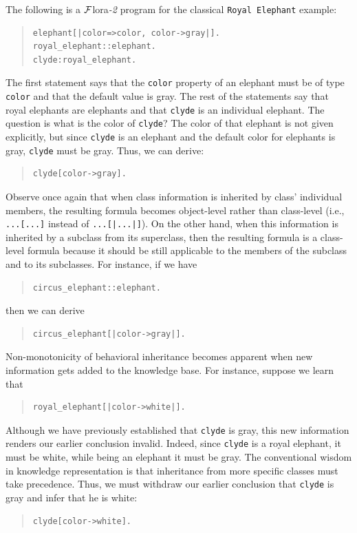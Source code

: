 \documentclass[11pt]{article}
\newcommand{\FLSYSTEM}{{\mbox{\sc ${\cal F}${lora}\rm\emph{-2}}}\xspace}
\begin{document}
The following is a \FLSYSTEM program for the classical {\tt Royal Elephant}
example:
\begin{quote}
\begin{verbatim}
elephant[|color=>color, color->gray|].
royal_elephant::elephant.
clyde:royal_elephant.
\end{verbatim}
\end{quote}
The first statement says that the \texttt{color} property of an elephant
must be of type \texttt{color} and that the default value is gray.  
The rest of the statements say that royal elephants are elephants and that
\texttt{clyde} is an individual elephant. 
The question is what is the color of {\tt clyde}? The color of that
elephant is not given explicitly, but since
{\tt clyde} is an elephant and the default color for elephants is gray,
{\tt clyde}
must be gray. Thus, we can derive:
\begin{quote}
\begin{verbatim}
clyde[color->gray].  
\end{verbatim}
\end{quote}
Observe once again that when class information is inherited by class'
individual members, the resulting formula becomes object-level rather than 
class-level (i.e., \texttt{...[...]} instead of \texttt{...[|...|]}).  
On the other
hand, when this information is inherited by a subclass from its superclass,
then the resulting formula is a class-level formula because it should be
still applicable to the members of the subclass and to its subclasses.
For instance, if we have
\begin{quote}
\begin{verbatim}
circus_elephant::elephant.
\end{verbatim}
\end{quote}
then we can derive 
\begin{quote}
\begin{verbatim}
circus_elephant[|color->gray|].  
\end{verbatim}
\end{quote}

Non-monotonicity of behavioral inheritance becomes apparent when new
information gets added to the knowledge base. For instance, suppose we
learn that
\begin{quote}
\begin{verbatim}
royal_elephant[|color->white|].  
\end{verbatim}
\end{quote}
Although we have previously established that {\tt clyde} is gray, this
new information renders our earlier conclusion invalid. Indeed, since
{\tt clyde} is a royal elephant, it must be white, while being an
elephant it must be gray.  The conventional wisdom in knowledge
representation is that inheritance from more specific classes
must take precedence. Thus, we must withdraw our earlier conclusion
that {\tt clyde} is gray and infer that he is white:
\begin{quote}
\begin{verbatim}
clyde[color->white].    
\end{verbatim}
\end{quote}
\end{document}
